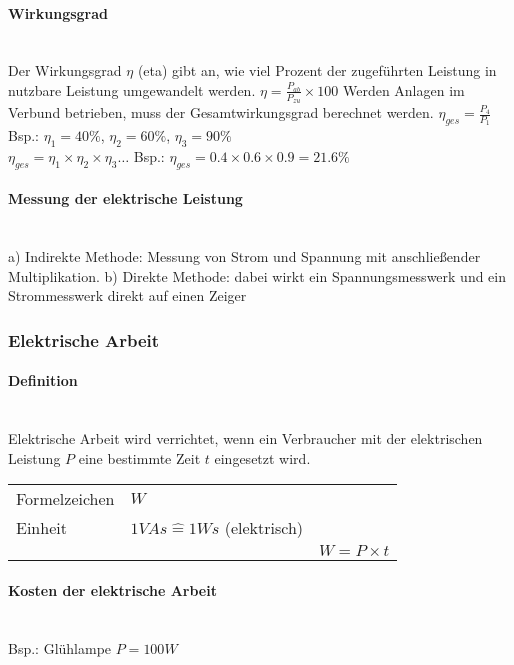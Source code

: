 \paragraph{Wirkungsgrad}~\\
Der Wirkungsgrad $\eta$ (eta) gibt an, wie viel Prozent der zugeführten Leistung in nutzbare Leistung umgewandelt werden. $\eta = \frac{P_{ab}}{P_{zu}}\times 100$
Werden Anlagen im Verbund betrieben, muss der Gesamtwirkungsgrad berechnet werden.
$\eta_{ges} = \frac{P_4}{P_1}$\\
Bsp.: $\eta_1 = 40\%$, $\eta_2 = 60\%$, $\eta_3 = 90\%$\\
$\eta_{ges} = \eta_1\times\eta_2\times\eta_3\dots$
Bsp.: $\eta_{ges} = 0.4\times0.6\times0.9 = 21.6\%$

\paragraph{Messung der elektrische Leistung}~\\
a) Indirekte Methode: Messung von Strom und Spannung mit anschließender Multiplikation. b) Direkte Methode: dabei wirkt ein Spannungsmesswerk und ein Strommesswerk direkt auf einen Zeiger

\subsubsection{Elektrische Arbeit}

\paragraph{Definition}~\\
Elektrische Arbeit wird verrichtet, wenn ein Verbraucher mit der elektrischen Leistung $P$ eine bestimmte Zeit $t$ eingesetzt wird.\\
\begin{tabular}{lll}
Formelzeichen & $W$ &\\
Einheit & $1VAs \widehat{=} 1Ws$ (elektrisch) &\\
& & $W = P\times t$\\
\end{tabular}

\paragraph{Kosten der elektrische Arbeit}~\\
Bsp.: Glühlampe $P = 100W$
\begin{tabular}{lll}

\end{tabular}



